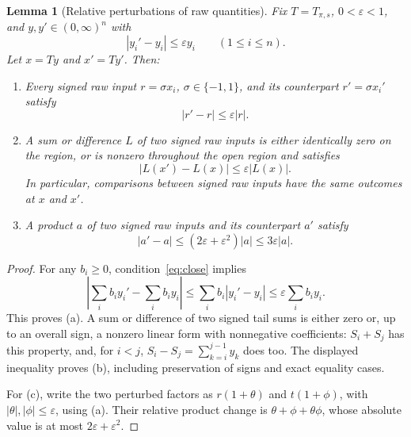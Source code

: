 \documentclass[11pt,a4paper]{article}
\numberwithin{equation}{section}
\newtheorem{lemma}[theorem]{Lemma}
\theoremstyle{definition}
\theoremstyle{remark}
\newcommand{\abs}[1]{\left|#1\right|}
\begin{document}
\begin{lemma}[Relative perturbations of raw quantities]\label{lem:geometry}
Fix $T=T_{\pi,s}$, $0<\varepsilon<1$, and $y,y'\in(0,\infty)^n$ with
\begin{equation}\label{eq:close}
 \abs{y_i'-y_i}\le\varepsilon y_i\qquad(1\le i\le n).
\end{equation}
Let $x=Ty$ and $x'=Ty'$.  Then:
\begin{enumerate}[label=\textup{(\alph*)}]
\item Every signed raw input $r=\sigma x_i$, $\sigma\in\{-1,1\}$,
and its counterpart $r'=\sigma x_i'$ satisfy
\begin{equation}\label{eq:rawperturb}
 \abs{r'-r}\le\varepsilon\abs r.
\end{equation}
\item A sum or difference $L$ of two signed raw inputs is either
identically zero on the region, or is nonzero throughout the open region
and satisfies
\begin{equation}\label{eq:linearperturb}
 \abs{L(x')-L(x)}\le\varepsilon\abs{L(x)}.
\end{equation}
In particular, comparisons between signed raw inputs have the same
outcomes at $x$ and $x'$.
\item A product $a$ of two signed raw inputs and its counterpart $a'$
satisfy
\begin{equation}\label{eq:productperturb}
 \abs{a'-a}\le(2\varepsilon+\varepsilon^2)\abs a
 \le3\varepsilon\abs a.
\end{equation}
\end{enumerate}
\end{lemma}

\begin{proof}
For any $b_i\ge0$, condition~\eqref{eq:close} implies
\[
 \abs{\sum_i b_i y_i'-\sum_i b_i y_i}
 \le\sum_i b_i\abs{y_i'-y_i}
 \le\varepsilon\sum_i b_i y_i.
\]
This proves (a).  A sum or difference of two signed tail sums is either
zero or, up to an overall sign, a nonzero linear form with nonnegative
coefficients: $S_i+S_j$ has this property, and, for $i<j$,
$S_i-S_j=\sum_{k=i}^{j-1}y_k$ does too.  The displayed inequality proves
(b), including preservation of signs and exact equality cases.

For (c), write the two perturbed factors as $r(1+\theta)$ and
$t(1+\phi)$, with $\abs\theta,\abs\phi\le\varepsilon$, using (a).
Their relative product change is
$\theta+\phi+\theta\phi$, whose absolute value is at most
$2\varepsilon+\varepsilon^2$.
\end{proof}
\end{document}
